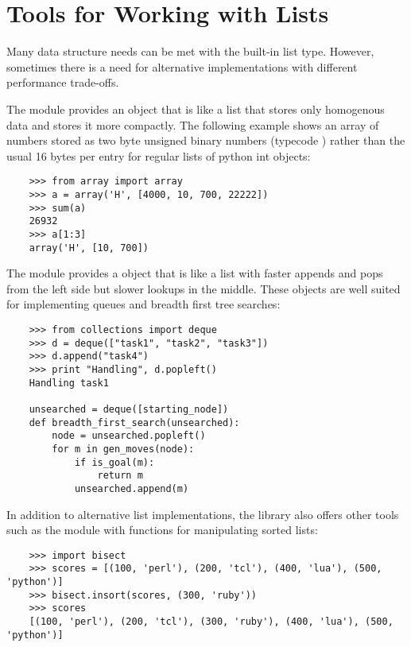 \documentclass{manual}
\begin{document}
\section{Tools for Working with Lists\label{list-tools}}

Many data structure needs can be met with the built-in list type.
However, sometimes there is a need for alternative implementations
with different performance trade-offs.

The  module provides an
 object that is like a list that stores only homogenous
data and stores it more compactly.  The following example shows an array
of numbers stored as two byte unsigned binary numbers (typecode
) rather than the usual 16 bytes per entry for regular lists
of python int objects:

\begin{verbatim}
    >>> from array import array
    >>> a = array('H', [4000, 10, 700, 22222])
    >>> sum(a)
    26932
    >>> a[1:3]
    array('H', [10, 700])
\end{verbatim}

The  module
provides a  object that is like a list with faster
appends and pops from the left side but slower lookups in the middle.
These objects are well suited for implementing queues and breadth first
tree searches:

\begin{verbatim}
    >>> from collections import deque
    >>> d = deque(["task1", "task2", "task3"])
    >>> d.append("task4")
    >>> print "Handling", d.popleft()
    Handling task1

    unsearched = deque([starting_node])
    def breadth_first_search(unsearched):
        node = unsearched.popleft()
        for m in gen_moves(node):
            if is_goal(m):
                return m
            unsearched.append(m)
\end{verbatim}

In addition to alternative list implementations, the library also offers
other tools such as the 
module with functions for manipulating sorted lists:

\begin{verbatim}
    >>> import bisect
    >>> scores = [(100, 'perl'), (200, 'tcl'), (400, 'lua'), (500, 'python')]
    >>> bisect.insort(scores, (300, 'ruby'))
    >>> scores
    [(100, 'perl'), (200, 'tcl'), (300, 'ruby'), (400, 'lua'), (500, 'python')]
\end{verbatim}
\end{document}

